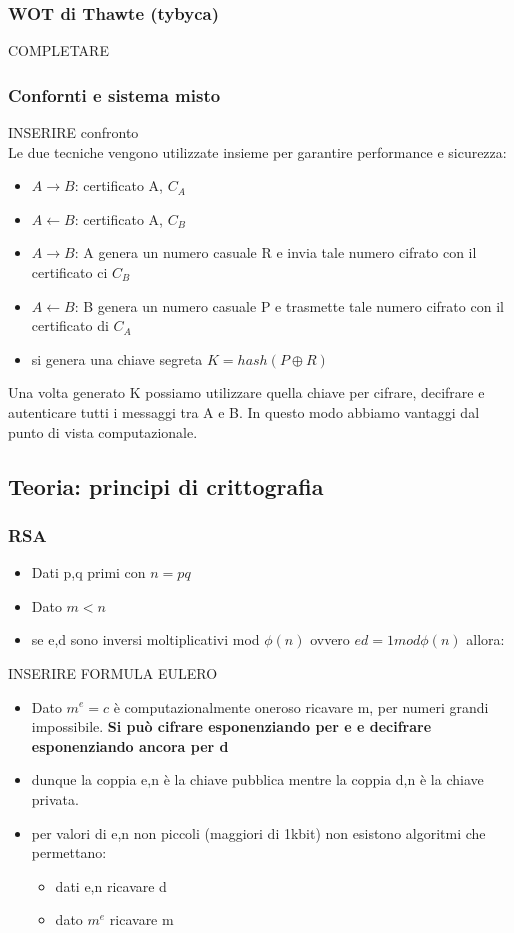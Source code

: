 \documentclass[12pt]{article}
\begin{document}
			\subsubsection{WOT di Thawte (tybyca)}
			 	COMPLETARE
			\subsubsection{Confornti e sistema misto}
				 INSERIRE confronto\\
				 Le due tecniche vengono utilizzate insieme per garantire performance e sicurezza:
				 \begin{itemize}
				 	\item $A \rightarrow B$: certificato A, $C_{A}$
				 	\item $A \leftarrow B$: certificato A, $C_{B}$
				 	\item $A \rightarrow B$: A genera un numero casuale R e invia tale numero cifrato con il certificato ci $C_{B}$
				 	\item $A \leftarrow B$: B genera un numero casuale P  e trasmette tale numero cifrato con il certificato di $C_{A}$
				 	\item si genera una chiave segreta  $K = hash(P\oplus R) $
				 \end{itemize}
			 	Una volta generato K possiamo utilizzare quella chiave per cifrare, decifrare e autenticare tutti i messaggi tra A e B. In questo modo abbiamo vantaggi dal punto di vista computazionale.
		\subsection{Teoria: principi di crittografia}
			\subsubsection{RSA}
			\begin{itemize}
				\item Dati p,q primi con $n = pq$
				\item Dato $m<n$
				\item se e,d sono inversi moltiplicativi mod $\phi(n)$ ovvero $ed = 1mod\phi(n)$ allora:
			\end{itemize}
		
			INSERIRE FORMULA EULERO\\
			
			\begin{itemize}
				\item Dato $m^{e}=c$ è computazionalmente oneroso ricavare m, per numeri grandi impossibile. \textbf{Si può cifrare esponenziando per e e decifrare esponenziando ancora per d}
				\item dunque la coppia e,n è la chiave pubblica mentre la coppia d,n è la chiave privata.
				\item per valori di e,n non piccoli (maggiori di 1kbit) non esistono algoritmi che permettano:
				\begin{itemize}
					\item dati e,n ricavare d
					\item dato $m^{e} $ ricavare m
				\end{itemize}
			\end{itemize}	
		
\end{document}
